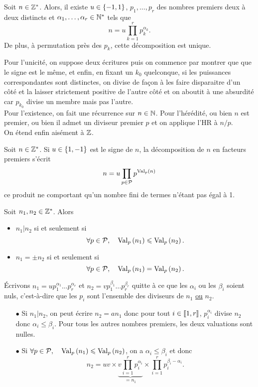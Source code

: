 \documentclass{magnolia}
\begin{document}
\begin{theoreme}[nom={Théorème de décomposition en nombres premiers}]
Soit $n\in\mathbb{Z}^*$. Alors, il existe $u\in\left\{-1,1\right\}$, $p_1,\ldots,p_r$ des nombres
premiers deux à deux distincts et $\alpha_1,\ldots,\alpha_r\in{\mathbb{N}^*}$ tels que
\[n=u\prod_{k=1}^r p_k^{\alpha_k}.\]
De plus, à permutation près des $p_k$, cette décomposition est unique.
\end{theoreme}

\begin{preuve}
Pour l'unicité, on suppose deux écritures puis on commence par montrer que  que le signe est le même, et enfin, en fixant un $k_0$ quelconque, si les puissances correspondantes sont distinctes, on divise de façon à les faire disparaitre d'un côté et la laisser strictement positive de l'autre côté et on aboutit à une absurdité car $p_{k_0}$ divise un membre mais pas l'autre.\\
Pour l'existence, on fait une récurrence sur $n\in \mathbb{N}$. Pour l'hérédité, ou bien $n$ est premier, ou bien il admet un diviseur premier $p$ et on applique l'HR à $n/p$.\\
On étend enfin aisément à $\mathbb{Z}$.
\end{preuve}

\begin{remarqueUnique}
\remarque Soit $n\in\mathbb{Z}^*$. Si $u\in\left\{1,-1\right\}$ est le signe de $n$, la décomposition de $n$ en facteurs
  premiers s'écrit
  \[n=u \prod_{p\in\mathcal{P}} p^{{\rm Val}_p(n)}\]
  ce produit ne comportant qu'un nombre fini de termes n'étant pas égal à 1.
\end{remarqueUnique}

\begin{proposition}
Soit $n_1,n_2\in\mathbb{Z}^*$. Alors
\begin{itemize}
\item $n_1|n_2$ si et seulement si
  \[\forall p\in\mathcal{P} ,\quad {\rm Val}_p\left(n_1\right)\leqslant {\rm Val}_p\left(n_2\right).\]
\item $n_1=\pm n_2$ si et seulement si
  \[\forall p\in\mathcal{P},\quad {\rm Val}_p\left(n_1\right)= {\rm Val}_p\left(n_2\right).\]
\end{itemize}
\end{proposition}

\begin{preuve}
\'Ecrivons $n_1=up_1^{\alpha_1}\ldots p_r^{\alpha_r}$ et $n_2=vp_1^{\beta_1}\ldots p_r^{\beta_r}$ quitte à ce que les $\alpha_i$ ou les $\beta_i$ soient nuls, c'est-à-dire que les $p_i$ sont l'ensemble des diviseurs de $n_1$ \underline{ou} $n_2$.

\begin{itemize}
\item[$\bullet$] Si $n_1|n_2$, on peut écrire $n_2=an_1$ donc pour tout $i\in \left\llbracket 1,r\right\rrbracket$, $p_i^{\alpha_i}$ divise $n_2$ donc $\alpha_i\leq \beta_i$. Pour tous les autres nombres premiers, les deux valuations sont nulles.
\item[$\bullet$] Si $\forall p\in\mathcal{P} ,\quad {\rm Val}_p\left(n_1\right)\leqslant {\rm Val}_p\left(n_2\right)$, on a $\alpha_i\leq \beta_i$ et donc $$n_2=uv\times \underbrace{v \prod_{i=1}^r p_i^{\alpha_i}}_{=n_1}\times \prod_{i=1}^r p_i^{\beta_i-\alpha_i}.$$
\end{itemize}
\end{preuve}
\end{document}

